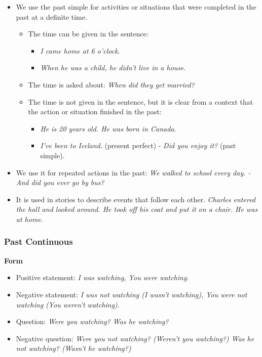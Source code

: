 \begin{itemize}

\item We use the past simple for activities or situations that were completed in the past at a definite time.

\begin{itemize}

\item The time can be given in the sentence:

\begin{itemize}
\item \textit{I came home at 6 o'clock}.
\item \textit{When he was a child, he didn't live in a house}.
\end{itemize}

\item The time is asked about: \textit{When did they get married?}

\item The time is not given in the sentence, but it is clear from a context that the action or situation finished in the past:
\begin{itemize}
\item \textit{He is 20 years old. He was born in Canada}.
\item \textit{I've been to Iceland}. (present perfect) - \textit{Did you enjoy it?} (past simple).
\end{itemize}

\end{itemize}

\item We use it for repeated actions in the past: \textit{We walked to school every day. - And did you ever go by bus?}

\item It is used in stories to describe events that follow each other. \textit{Charles entered the hall and looked around. He took off his coat and put it on a chair. He was at home}.

\end{itemize}

\subsubsection{Past Continuous}

\textbf{Form}

\begin{itemize}

\item Positive statement: \textit{I was watching, You were watching}.
\item Negative statement: \textit{I was not watching (I wasn't watching), You were not watching (You weren't watching)}.
\item Question: \textit{Were you watching? Was he watching?}
\item Negative question: \textit{Were you not watching? (Weren't you watching?) Was he not watching? (Wasn't he watching?)}

\end{itemize}

